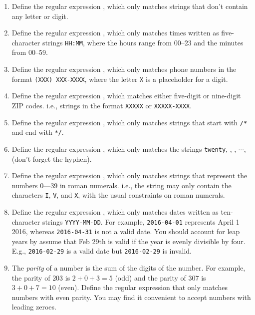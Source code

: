 \begin{enumerate}

  \item Define the regular expression , which only matches strings that don't contain any letter or digit.

  \item Define the regular expression , which only matches times written as five-character strings \texttt{HH:MM}, where the hours range from 00--23 and the minutes from 00--59.

  \item Define the regular expression , which only matches phone numbers in the format \texttt{(XXX) XXX-XXXX}, where the letter \texttt{X} is a placeholder for a digit.

  \item Define the regular expression , which matches either five-digit or nine-digit ZIP codes. i.e., strings in the format \texttt{XXXXX} or \texttt{XXXXX-XXXX}.

  \item Define the regular expression , which only matches strings that start with \texttt{/*} and end with \texttt{*/}.

  \item Define the regular expression , which only matches the strings \texttt{twenty}, , , $\cdots$,  (don't forget the hyphen).

  \item Define the regular expression , which only matches strings that represent the numbers 0---39 in roman numerals. i.e., the string may only contain the characters \texttt{I}, \texttt{V}, and \texttt{X}, with the usual constraints on roman numerals.


  \item Define the regular expression , which only matches dates written as ten-character strings \texttt{YYYY-MM-DD}. For example, \texttt{2016-04-01} represents April 1 2016, whereas \texttt{2016-04-31} is not a valid date. You should account for leap years by assume that Feb 29th is valid if the year is evenly divisible by four. E.g., \texttt{2016-02-29} is a valid date but \texttt{2016-02-29} is invalid.

  \item The \emph{parity} of a number is the sum of the digits of the number. For example, the parity of $203$ is $2 + 0 + 3 = 5$ (odd) and the parity of $307$ is $3 + 0 + 7 = 10$ (even). Define the regular expression  that only matches numbers with even parity. You may find it convenient to accept numbers with leading zeroes.

\end{enumerate}

